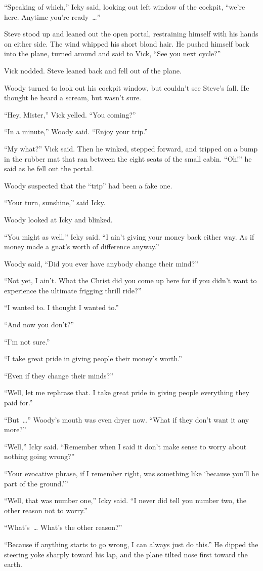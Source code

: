 “Speaking of which,” Icky said, looking out left window of the cockpit, “we’re here. Anytime you’re ready~…”

Steve stood up and leaned out the open portal, restraining himself with his hands on either side. The wind whipped his short blond hair. He pushed himself back into the plane, turned around and said to Vick, “See you next cycle?”

Vick nodded. Steve leaned back and fell out of the plane.

Woody turned to look out his cockpit window, but couldn’t see Steve’s fall. He thought he heard a scream, but wasn’t sure.

“Hey, Mister,” Vick yelled. “You coming?”

“In a minute,” Woody said. “Enjoy your trip.”

“My what?” Vick said. Then he winked, stepped forward, and tripped on a bump in the rubber mat that ran between the eight seats of the small cabin. “Oh!” he said as he fell out the portal.

Woody suspected that the “trip” had been a fake one.

“Your turn, sunshine,” said Icky.

Woody looked at Icky and blinked.

“You might as well,” Icky said. “I ain’t giving your money back either way. As if money made a gnat’s worth of difference anyway.”

Woody said, “Did you ever have anybody change their mind?”

“Not yet, I ain’t. What the Christ did you come up here for if you didn’t want to experience the ultimate frigging thrill ride?”

“I wanted to. I thought I wanted to.”

“And now you don’t?”

“I’m not sure.”

“I take great pride in giving people their money’s worth.”

“Even if they change their minds?”

“Well, let me rephrase that. I take great pride in giving people everything they paid for.”

“But~…” Woody’s mouth was even dryer now. “What if they don’t want it any more?”

“Well,” Icky said. “Remember when I said it don’t make sense to worry about nothing going wrong?”

“Your evocative phrase, if I remember right, was something like ‘because you’ll be part of the ground.’\thinspace”

“Well, that was number one,” Icky said. “I never did tell you number two, the other reason not to worry.”

“What’s~… What’s the other reason?”

“Because if anything starts to go wrong, I can always just do this.” He dipped the steering yoke sharply toward his lap, and the plane tilted nose first toward the earth.

